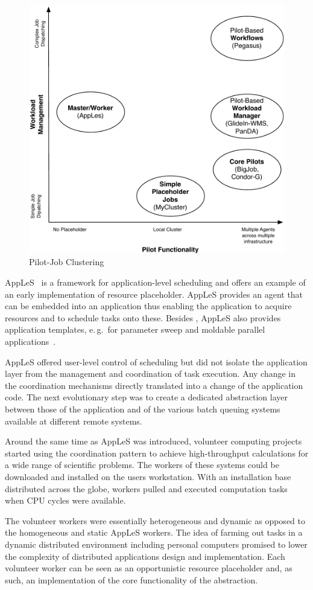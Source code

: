 \documentclass{sig-alternate}
\begin{document}
\begin{figure}[t]
  \centering
    \includegraphics[width=.45\textwidth]{figures/pilotjob-clustering.pdf}
  \caption{Pilot-Job Clustering}
  \label{fig:pilotjob_clustering}
\end{figure}

AppLeS~\cite{Berman:1996:apples} is a framework for application-level scheduling
and offers an example of an early implementation of resource placeholder. AppLeS
provides an agent that can be embedded into an application thus enabling the
application to acquire resources and to schedule tasks onto these. Besides \MW,
AppLeS also provides application templates, e.\,g.\ for parameter sweep and
moldable parallel applications~\cite{Berman:2003:ACG:766629.766632}.

AppLeS offered user-level control of scheduling but did not isolate the
application layer from the management and coordination of task execution. Any
change in the coordination mechanisms directly translated into a change of the
application code. The next evolutionary step was to create a dedicated
abstraction layer between those of the application and of the various batch
queuing systems available at different remote systems.

Around the same time as AppLeS was introduced, volunteer computing projects
started using the \MW coordination pattern to achieve high-throughput
calculations for a wide range of scientific problems. The workers of these
systems could be downloaded and installed on the users workstation.
With an installation base distributed across the globe, workers pulled and
executed computation tasks when CPU cycles were available.

The volunteer workers were essentially heterogeneous and dynamic as opposed to
the homogeneous and static AppLeS workers. The idea of farming out tasks in a
dynamic distributed environment including personal computers promised to lower
the complexity of distributed applications design and implementation. Each
volunteer worker can be seen as an opportunistic resource placeholder and, as
such, an implementation of the core functionality of the \pilot abstraction.
\end{document}

